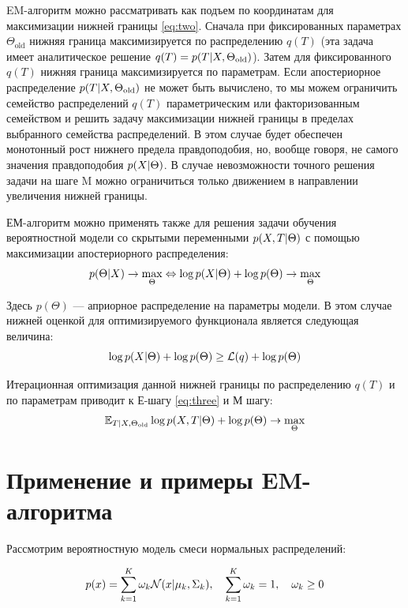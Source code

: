 EM-алгоритм можно рассматривать как подъем по координатам для максимизации нижней границы \ref{eq:two}. Сначала при фиксированных параметрах $\Theta_{\text{old}}$ нижняя граница максимизируется по распределению $q(T)$ (эта задача имеет аналитическое решение $q(T) = p(T \arrowvert X,  \Theta_{\text{old}})$). Затем для фиксированного $q(T)$ нижняя граница максимизируется по параметрам. Если апостериорное распределение $p(T \arrowvert X, \Theta_{\text{old}})$ не может быть вычислено, то мы можем ограничить семейство распределений $q(T)$ параметрическим или факторизованным семейством и решить задачу максимизации нижней границы в пределах выбранного семейства распределений. В этом случае будет обеспечен монотонный рост нижнего предела правдоподобия, но, вообще говоря, не самого значения правдоподобия $p(X \arrowvert \Theta)$. В случае невозможности точного решения задачи на шаге M можно ограничиться только движением в направлении увеличения нижней границы.\cite{em}
          
ЕМ-алгоритм можно применять также для решения задачи обучения вероятностной модели со скрытыми переменными $p(X, T \arrowvert \Theta )$ с помощью максимизации апостериорного распределения:
$$
p(\Theta \arrowvert X) \rightarrow \max\limits_{\Theta}^{} \Leftrightarrow \log{p(X \arrowvert \Theta)} + \log{p(\Theta)} \rightarrow \max\limits_{\Theta}^{}
$$

Здесь $p(\Theta)$ — априорное распределение на параметры модели. В этом случае нижней оценкой для оптимизируемого функционала является следующая величина:
$$
 \log{p(X \arrowvert \Theta)} + \log{p(\Theta)} \geq \mathcal{L}(q) + \log{p(\Theta)}
$$

Итерационная оптимизация данной нижней границы по распределению $q(T)$ и по параметрам приводит к Е-шагу \ref{eq:three} и М шагу:
$$
 \mathbb{E}_{T \arrowvert X,  \Theta_{\text{old}}}\log{p(X, T \arrowvert \Theta)} + \log{p(\Theta)} \rightarrow \max\limits_{\Theta}^{}
$$
\section{Применение и примеры EM-алгоритма}

Рассмотрим вероятностную модель смеси нормальных распределений:

\begin{equation} \label{eq:five}
 p(x) = \sum\limits_{k=1}^{K} \omega_k \mathcal{N}(x \arrowvert \mu_k,  \Sigma_k), \quad \sum\limits_{k=1}^{K} \omega_k = 1, \quad \omega_k \geq 0 
\end{equation}

